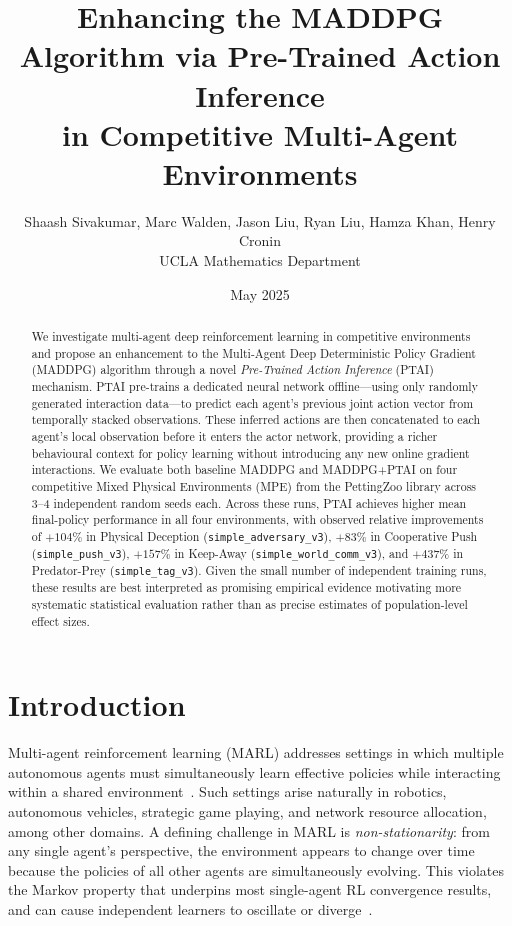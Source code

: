 \documentclass[12pt]{article}
\title{Enhancing the MADDPG Algorithm via Pre-Trained Action Inference\\
       in Competitive Multi-Agent Environments}
\author{
{\fontsize{12}{13}\selectfont
Shaash Sivakumar, Marc Walden, Jason Liu, Ryan Liu, Hamza Khan, Henry Cronin}\\
{\footnotesize UCLA Mathematics Department}
}
\date{May 2025}
\begin{document}
\maketitle

\begin{abstract}
We investigate multi-agent deep reinforcement learning in competitive environments and
propose an enhancement to the Multi-Agent Deep Deterministic Policy Gradient (MADDPG)
algorithm through a novel \emph{Pre-Trained Action Inference} (PTAI) mechanism. PTAI
pre-trains a dedicated neural network offline---using only randomly generated interaction
data---to predict each agent's previous joint action vector from temporally stacked
observations. These inferred actions are then concatenated to each agent's local
observation before it enters the actor network, providing a richer behavioural context
for policy learning without introducing any new online gradient interactions. We evaluate
both baseline MADDPG and MADDPG+PTAI on four competitive Mixed Physical Environments
(MPE) from the PettingZoo library across 3--4 independent random seeds each. Across these
runs, PTAI achieves higher mean final-policy performance in all four environments, with
observed relative improvements of $+104\%$ in Physical Deception
(\texttt{simple\_adversary\_v3}), $+83\%$ in Cooperative Push
(\texttt{simple\_push\_v3}), $+157\%$ in Keep-Away
(\texttt{simple\_world\_comm\_v3}), and $+437\%$ in Predator-Prey
(\texttt{simple\_tag\_v3}). Given the small number of independent training runs, these
results are best interpreted as promising empirical evidence motivating more systematic
statistical evaluation rather than as precise estimates of population-level effect sizes.
\end{abstract}

\tableofcontents
\newpage

\section{Introduction}

Multi-agent reinforcement learning (MARL) addresses settings in which multiple autonomous
agents must simultaneously learn effective policies while interacting within a shared
environment~\cite{busoniu2008comprehensive}. Such settings arise naturally in robotics,
autonomous vehicles, strategic game playing, and network resource allocation, among other
domains. A defining challenge in MARL is \emph{non-stationarity}: from any single agent's
perspective, the environment appears to change over time because the policies of all other
agents are simultaneously evolving. This violates the Markov property that underpins most
single-agent RL convergence results, and can cause independent learners to oscillate or
diverge~\cite{tan1993multi}.
\end{document}

